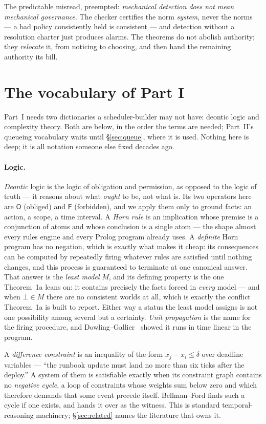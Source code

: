 \documentclass[11pt,a4paper]{article}
\newcommand{\Ob}{\mathsf{O}}
\newcommand{\Fb}{\mathsf{F}}
\begin{document}
The predictable misread, preempted: \emph{mechanical detection does not mean mechanical governance}. The checker certifies the
norm \emph{system}, never the norms --- a bad policy consistently held is consistent --- and detection without a resolution charter
just produces alarms. The theorems do not abolish authority; they \emph{relocate} it, from noticing to choosing, and then hand the
remaining authority its bill.



\section{The vocabulary of Part I}\label{sec:vocab}
Part~I needs two dictionaries a scheduler-builder may not have: deontic logic and complexity theory. Both are below, in the order
the terms are needed; Part~II's queueing vocabulary waits until \S\ref{sec:queue}, where it is used. Nothing here is deep; it is
all notation someone else fixed decades ago.

\paragraph{Logic.} \emph{Deontic} logic is the logic of obligation and permission, as opposed to the
logic of truth --- it reasons about what \emph{ought} to be, not what is. Its two operators here are $\Ob$ (obliged) and
$\Fb$ (forbidden), and we apply them only to ground facts: an action, a scope, a time interval. A \emph{Horn rule} is an
implication whose premise is a conjunction of atoms and whose conclusion is a single atom --- the shape almost every rules
engine and every Prolog program already uses. A \emph{definite} Horn program has no negation, which is exactly what makes it
cheap: its consequences can be computed by repeatedly firing whatever rules are satisfied until nothing changes, and this
process is guaranteed to terminate at one canonical answer. That answer is the \emph{least model} $M$, and its defining property
is the one Theorem~1a leans on: it contains precisely the facts forced in \emph{every} model --- and when $\bot \in M$ there are
no consistent worlds at all, which is exactly the conflict Theorem~1a is built to report. Either way a status the least model
assigns is not one possibility among several but a certainty. \emph{Unit propagation} is the name for the firing procedure,
and Dowling--Gallier~\cite{dg84} showed it runs in time linear in the program.

A \emph{difference constraint} is an inequality of the form $x_j - x_i \le \delta$ over deadline variables --- ``the runbook
update must land no more than six ticks after the deploy.'' A system of them is satisfiable exactly when its constraint
graph contains no \emph{negative cycle}, a loop of constraints whose weights sum below zero and which therefore demands that
some event precede itself. Bellman--Ford finds such a cycle if one exists, and hands it over as the witness. This is
standard temporal-reasoning machinery; \S\ref{sec:related} names the literature that owns it.
\end{document}
